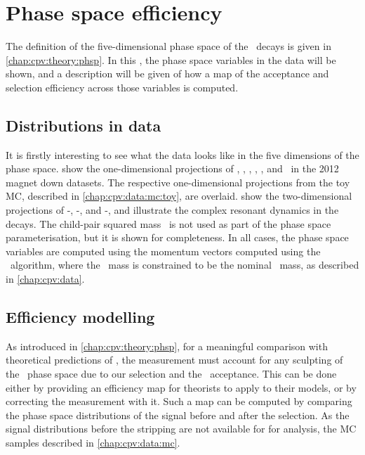 \chapter{Phase space efficiency}
\label{chap:cpv:phsp}

The definition of the five-dimensional phase space of the \LcTophh\ decays is 
given in \cref{chap:cpv:theory:phsp}.
In this , the phase space variables in the data will be 
shown, and a description will be given of how a map of the acceptance and 
selection efficiency across those variables is computed.

\section{Distributions in data}
\label{chap:cpv:phsp:data}

It is firstly interesting to see what the data looks like in the five 
dimensions of the phase space.
 show the 
one-dimensional projections of \msqphm, \msqphp, \msqhh, \thetap, \phip, and 
\phihh\ in the 2012 magnet down datasets.
The respective one-dimensional projections from the toy \ac{MC}, described in 
\cref{chap:cpv:data:mc:toy}, are overlaid.
 show the 
two-dimensional projections of \msqphp-\msqhh, \msqphm-\msqphp, and 
\msqphp-\msqhh, and illustrate the complex resonant dynamics in the decays.
The child-pair squared mass \msqphp\ is not used as part of the phase space 
parameterisation, but it is shown for completeness.
In all cases, the phase space variables are computed using the momentum vectors 
computed using the \decaytreefitter\ algorithm, where the \phh\ mass is 
constrained to be the nominal \PLambdac\ mass, as described in 
\cref{chap:cpv:data}.

\section{Efficiency modelling}
\label{sec:phsp:eff}

As introduced in \cref{chap:cpv:theory:phsp}, for a meaningful comparison with 
theoretical predictions of \dACP, the measurement must account for any 
sculpting of the \PLambdac\ phase space due to our selection and the \lhcb\ 
acceptance.
This can be done either by providing an efficiency map for theorists to apply 
to their models, or by correcting the measurement with it.
Such a map can be computed by comparing the phase space distributions of the 
signal before and after the selection.
As the signal distributions before the stripping are not available for for 
analysis, the \ac{MC} samples described in \cref{chap:cpv:data:mc}.

